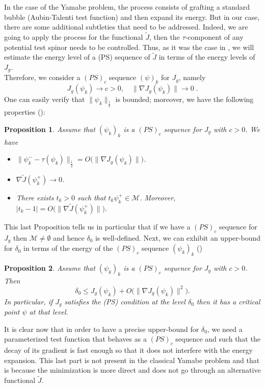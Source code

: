 \documentclass[11pt]{article}
\newtheorem{proposition}{Proposition}[section]
\begin{document}
{\noindent
In the case of the Yamabe problem, the process consists of grafting a standard bubble (Aubin-Talenti test function) and then expand its energy. But in our case, there are some additional subtleties that need to be addressed. Indeed, we are going to apply the process for the functional $\tilde{J}$, then the $\tau$-component of any potential test spinor needs to be controlled. Thus, as it was the case in \cite{MMM}, we will estimate the energy level of a (PS) sequence of $\tilde{J}$ in terms of the energy levels of $J_{g}$.\\
Therefore, we consider a $(PS)_{c}$ sequence $(\psi)_{k}$ for $J_{g}$, namely
$$J_{g}(\psi_{k})\to c>0, \quad \|\nabla J_{g}(\psi_{k})\|\to 0 \; .$$
One can easily verify that $\|\psi_{k}\|_{\frac{1}{2}}$ is bounded; moreover, we have the following properties (\cite{MMM}):
\begin{proposition}\label{prop diff}
Assume that $(\psi_{k})_{k}$ is a $(PS)_{c}$ sequence for $J_{g}$ with $c>0$. We have
\begin{itemize}
\item[i)] $\|\psi_{k}^{-}-\tau(\psi_{k})\|_{\frac{1}{2}}=O\Big(\|\nabla J_{g}(\psi_{k})\|\Big)$.
\item[ii)]$\nabla\tilde{J}(\psi_{k}^{+})\to 0$.
\item[iii)] There exists $t_{k}>0$ such that $t_{k}\psi_{k}^{+}\in \mathcal{M}$. Moreover, $|t_{k}-1|=O\Big(\|\nabla \tilde{J}(\psi_{k}^{+})\|\Big)$.
\end{itemize}
\end{proposition}

\noindent
This last Proposition tells us in particular that if we have a $(PS)_{c}$ sequence for $J_{g}$ then $\mathcal{M}\not= \emptyset$ and hence $\delta_{0}$ is well-defined. Next, we can exhibit an upper-bound for $\delta_{0}$ in terms of the energy of the 
$(PS)_{c}$ sequence $(\psi_{k})_{k}$ (\cite{MMM})

\begin{proposition}\label{prop exp}
Assume that $(\psi_{k})_{k}$ is a $(PS)_{c}$ sequence for $J_{g}$ with $c>0$. Then
$$\delta_{0}\leq J_{g}(\psi_{k})+O\Big(\|\nabla J_{g}(\psi_{k})\|^{2}\Big).$$
In particular, if $J_{g}$ satisfies the (PS) condition at the level $\delta_{0}$ then it has a critical point $\psi$ at that level.
\end{proposition}


\noindent
It is clear now that in order to have a precise upper-bound for $\delta_{0}$, we need a parameterized test function that behaves as a $(PS)_{c}$ sequence and such that the decay of its gradient is fast enough so that it does not interfere with the energy expansion. This last part is not present in the classical Yamabe problem and that is because the minimization is more direct and does not go through an alternative functional $\tilde{J}$.

}
\end{document}
